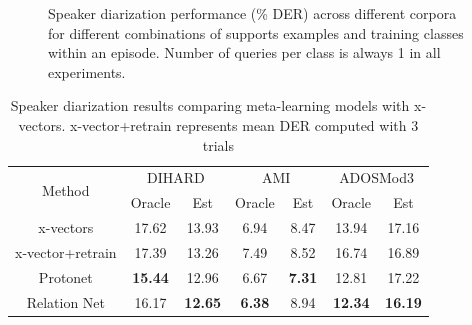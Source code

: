 \begin{figure}[h]
\caption{Speaker diarization performance (\% DER) across different corpora for different combinations of supports examples and training classes within an episode. Number of queries per class is always 1 in all experiments.}
\label{fig:wayShotExpt}
\end{figure}

\begin{table}[h!]
\caption{Speaker diarization results comparing meta-learning models with x-vectors. x-vector+retrain represents mean DER computed with 3 trials}
\label{tab:spkrDiarCore}
\centering
\begin{tabular}{ccccccc} \\ \hline
\multirow{2}{*}{Method} & \multicolumn{2}{c}{DIHARD} & \multicolumn{2}{c}{AMI} & \multicolumn{2}{c}{ADOSMod3} \\
 & Oracle & Est & Oracle & Est & Oracle & Est \\ \hline
x-vectors & 17.62 & 13.93 & 6.94 & 8.47 & 13.94 & 17.16 \\
x-vector+retrain &  17.39 & 13.26 & 7.49 & 8.52 & 16.74 & 16.89 \\ \hdashline
\rule{0pt}{2ex}
Protonet & \textbf{15.44} & 12.96 & 6.67 & \textbf{7.31} & 12.81 & 17.22 \\ 
Relation Net & 16.17 & \textbf{12.65} & \textbf{6.38} & 8.94 & \textbf{12.34} & \textbf{16.19} \\ \hline
\end{tabular}
\end{table}

